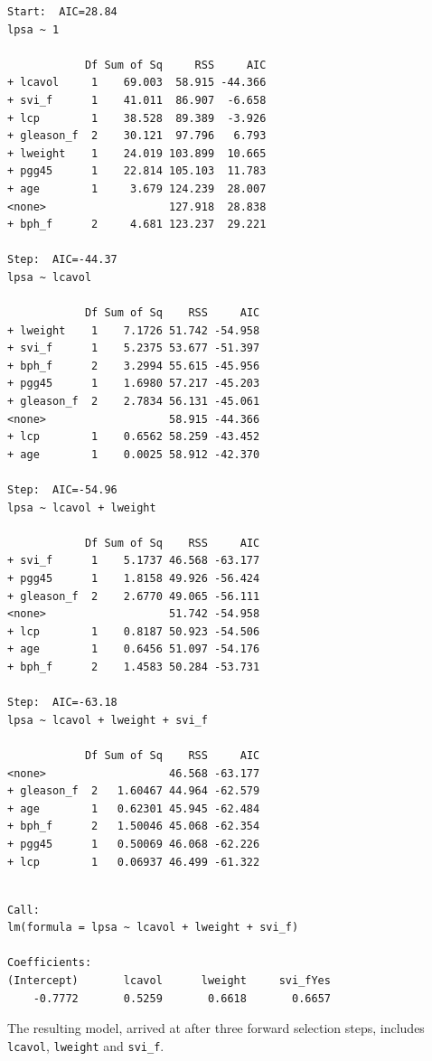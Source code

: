\documentclass[]{book}
\newenvironment{Shaded}{\begin{snugshade}}{\end{snugshade}}
\newcommand{\KeywordTok}[1]{\textcolor[rgb]{0.13,0.29,0.53}{\textbf{#1}}}
\newcommand{\DataTypeTok}[1]{\textcolor[rgb]{0.13,0.29,0.53}{#1}}
\newcommand{\StringTok}[1]{\textcolor[rgb]{0.31,0.60,0.02}{#1}}
\newcommand{\OperatorTok}[1]{\textcolor[rgb]{0.81,0.36,0.00}{\textbf{#1}}}
\newcommand{\NormalTok}[1]{#1}
\theoremstyle{definition}
\theoremstyle{definition}
\theoremstyle{definition}
\theoremstyle{remark}
\begin{document}
\begin{verbatim}
Start:  AIC=28.84
lpsa ~ 1

            Df Sum of Sq     RSS     AIC
+ lcavol     1    69.003  58.915 -44.366
+ svi_f      1    41.011  86.907  -6.658
+ lcp        1    38.528  89.389  -3.926
+ gleason_f  2    30.121  97.796   6.793
+ lweight    1    24.019 103.899  10.665
+ pgg45      1    22.814 105.103  11.783
+ age        1     3.679 124.239  28.007
<none>                   127.918  28.838
+ bph_f      2     4.681 123.237  29.221

Step:  AIC=-44.37
lpsa ~ lcavol

            Df Sum of Sq    RSS     AIC
+ lweight    1    7.1726 51.742 -54.958
+ svi_f      1    5.2375 53.677 -51.397
+ bph_f      2    3.2994 55.615 -45.956
+ pgg45      1    1.6980 57.217 -45.203
+ gleason_f  2    2.7834 56.131 -45.061
<none>                   58.915 -44.366
+ lcp        1    0.6562 58.259 -43.452
+ age        1    0.0025 58.912 -42.370

Step:  AIC=-54.96
lpsa ~ lcavol + lweight

            Df Sum of Sq    RSS     AIC
+ svi_f      1    5.1737 46.568 -63.177
+ pgg45      1    1.8158 49.926 -56.424
+ gleason_f  2    2.6770 49.065 -56.111
<none>                   51.742 -54.958
+ lcp        1    0.8187 50.923 -54.506
+ age        1    0.6456 51.097 -54.176
+ bph_f      2    1.4583 50.284 -53.731

Step:  AIC=-63.18
lpsa ~ lcavol + lweight + svi_f

            Df Sum of Sq    RSS     AIC
<none>                   46.568 -63.177
+ gleason_f  2   1.60467 44.964 -62.579
+ age        1   0.62301 45.945 -62.484
+ bph_f      2   1.50046 45.068 -62.354
+ pgg45      1   0.50069 46.068 -62.226
+ lcp        1   0.06937 46.499 -61.322
\end{verbatim}

\begin{verbatim}

Call:
lm(formula = lpsa ~ lcavol + lweight + svi_f)

Coefficients:
(Intercept)       lcavol      lweight     svi_fYes  
    -0.7772       0.5259       0.6618       0.6657  
\end{verbatim}

The resulting model, arrived at after three forward selection steps,
includes \texttt{lcavol}, \texttt{lweight} and \texttt{svi\_f}.

\begin{Shaded}
\end{Shaded}
\end{document}
